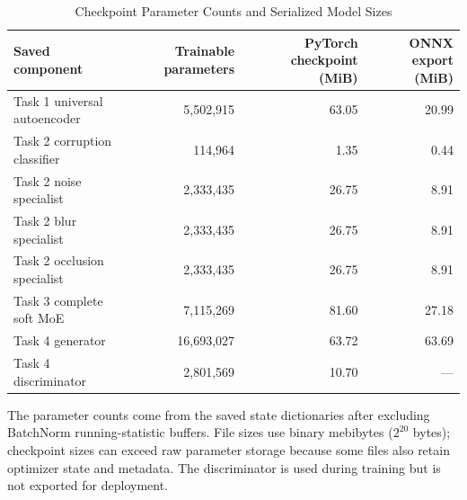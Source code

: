 \documentclass[journal,compsoc]{IEEEtran}
\begin{document}
\begin{table}[!t]
\caption{Checkpoint Parameter Counts and Serialized Model Sizes}
\label{tab:model_sizes}
\centering
\begin{tabular}{lrrr}
\toprule
\textbf{Saved component} & \textbf{Trainable parameters} & \textbf{PyTorch checkpoint (MiB)} & \textbf{ONNX export (MiB)} \\
\midrule
Task 1 universal autoencoder & 5,502,915 & 63.05 & 20.99 \\
Task 2 corruption classifier & 114,964 & 1.35 & 0.44 \\
Task 2 noise specialist & 2,333,435 & 26.75 & 8.91 \\
Task 2 blur specialist & 2,333,435 & 26.75 & 8.91 \\
Task 2 occlusion specialist & 2,333,435 & 26.75 & 8.91 \\
Task 3 complete soft MoE & 7,115,269 & 81.60 & 27.18 \\
Task 4 generator & 16,693,027 & 63.72 & 63.69 \\
Task 4 discriminator & 2,801,569 & 10.70 & --- \\
\bottomrule
\end{tabular}
\end{table}

The parameter counts come from the saved state dictionaries after excluding BatchNorm running-statistic buffers. File sizes use binary mebibytes ($2^{20}$ bytes); checkpoint sizes can exceed raw parameter storage because some files also retain optimizer state and metadata. The discriminator is used during training but is not exported for deployment.

\begin{table}[!t]
\caption{Exact ONNX Runtime Tensor Interfaces (Dynamic Batch Dimension $B$)}
\label{tab:onnx_interfaces}
\centering
{}
\end{table}
\end{document}
